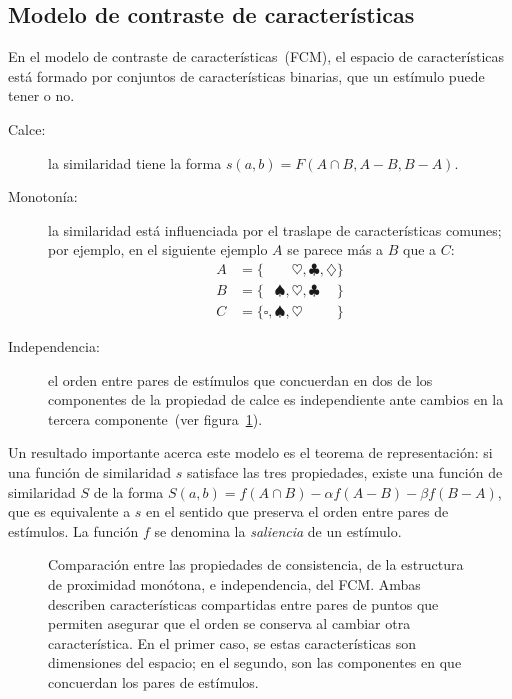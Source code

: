 \documentclass[spanish]{article}
\newcommand{\SMA}{\square}
\newcommand{\SMB}{\spadesuit}
\newcommand{\SMC}{\heartsuit}
\newcommand{\SMD}{\clubsuit}
\newcommand{\SME}{\diamondsuit}
\begin{document}
\subsection{Modelo de contraste de características}
En el modelo de contraste de características~(FCM), el espacio de características está formado por
conjuntos de características binarias, que un estímulo puede tener o no.
\begin{description}
    \item [Calce:] la similaridad tiene la forma $s(a, b) = F(A\cap B, A-B, B-A)$.
    \item [Monotonía:] la similaridad está influenciada por el traslape de características comunes;
        por ejemplo, en el siguiente ejemplo $A$ se parece más a $B$ que a $C$:
        \begin{align*}
            A &= \{\phantom{\SMA,  \SMB,} \SMC,          \SMD,          \SME\}  \\
            B &= \{\phantom{\SMA,} \SMB,  \SMC,          \SMD\phantom{, \SME}\} \\
            C &=          \{\SMA,  \SMB,  \SMC\phantom{, \SMD,          \SME}\}
        \end{align*}
    \item [Independencia:] el orden entre pares de estímulos que concuerdan en
        dos de los componentes de la propiedad de calce es independiente ante
        cambios en la tercera componente~(ver figura~\ref{fig:comparacion}).
\end{description}
Un resultado importante acerca este modelo es el teorema de representación: si una función de
similaridad $s$ satisface las tres propiedades, existe una función de similaridad $S$ de la forma
$S(a, b) = f(A\cap B) - \alpha f(A-B) - \beta f(B-A)$, que es equivalente a $s$ en el sentido que
preserva el orden entre pares de estímulos.  La función $f$ se denomina la \emph{saliencia} de un
estímulo.

\begin{figure}[t]
  \centering
  \caption{\small %
    Comparación entre las propiedades de consistencia, de la estructura de
    proximidad monótona, e independencia, del FCM.  Ambas describen
    características compartidas entre pares de puntos que permiten asegurar que el
    orden se conserva al cambiar otra característica.  En el primer caso, se
    estas características son dimensiones del espacio; en el segundo, son las
    componentes en que concuerdan los pares de estímulos.
  }
  \label{fig:comparacion}
\end{figure}
\end{document}
